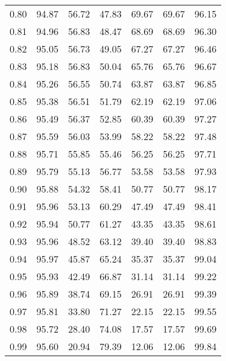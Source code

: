 \begin{tabular}{|c|c|c|c|c|c|c|}
      0.80 &     94.87 &     56.72 &      47.83 &   69.67 &      69.67 &         96.15 \\
      0.81 &     94.96 &     56.83 &      48.47 &   68.69 &      68.69 &         96.30 \\
      0.82 &     95.05 &     56.73 &      49.05 &   67.27 &      67.27 &         96.46 \\
      0.83 &     95.18 &     56.83 &      50.04 &   65.76 &      65.76 &         96.67 \\
      0.84 &     95.26 &     56.55 &      50.74 &   63.87 &      63.87 &         96.85 \\
      0.85 &     95.38 &     56.51 &      51.79 &   62.19 &      62.19 &         97.06 \\
      0.86 &     95.49 &     56.37 &      52.85 &   60.39 &      60.39 &         97.27 \\
      0.87 &     95.59 &     56.03 &      53.99 &   58.22 &      58.22 &         97.48 \\
      0.88 &     95.71 &     55.85 &      55.46 &   56.25 &      56.25 &         97.71 \\
      0.89 &     95.79 &     55.13 &      56.77 &   53.58 &      53.58 &         97.93 \\
      0.90 &     95.88 &     54.32 &      58.41 &   50.77 &      50.77 &         98.17 \\
      0.91 &     95.96 &     53.13 &      60.29 &   47.49 &      47.49 &         98.41 \\
      0.92 &     95.94 &     50.77 &      61.27 &   43.35 &      43.35 &         98.61 \\
      0.93 &     95.96 &     48.52 &      63.12 &   39.40 &      39.40 &         98.83 \\
      0.94 &     95.97 &     45.87 &      65.24 &   35.37 &      35.37 &         99.04 \\
      0.95 &     95.93 &     42.49 &      66.87 &   31.14 &      31.14 &         99.22 \\
      0.96 &     95.89 &     38.74 &      69.15 &   26.91 &      26.91 &         99.39 \\
      0.97 &     95.81 &     33.80 &      71.27 &   22.15 &      22.15 &         99.55 \\
      0.98 &     95.72 &     28.40 &      74.08 &   17.57 &      17.57 &         99.69 \\
      0.99 &     95.60 &     20.94 &      79.39 &   12.06 &      12.06 &         99.84 \\
\bottomrule
\end{tabular}
